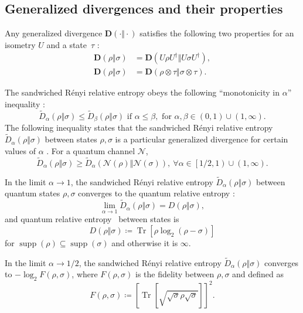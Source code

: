 \documentclass[aps,pra,twocolumn,superscriptaddress,longbibliography]{revtex4-1}
\def\Tr{\operatorname{Tr}}
\def\supp{\operatorname{supp}}
\def\){\right)}
\def\[{\left[}
\newcommand{\mc}[1]{\mathcal{#1}}
\newcommand{\wt}[1]{\widetilde{#1}}
\newcommand{\tf}[1]{\textbf{#1}}
\begin{document}
\begin{appendix}

\section{Generalized divergences and their properties}\label{App:Div}
Any generalized divergence $\tf{D}(\cdot\Vert\cdot)$ satisfies the following two properties for an isometry $U$ and a state~$\tau$ \cite{WWY14}:
\begin{align}
\mathbf{D}(\rho\Vert \sigma) & = \mathbf{D}(U\rho U^\dag\Vert U \sigma U^\dag),\label{eq:gen-div-unitary}\\
\mathbf{D}(\rho\Vert \sigma) & = \mathbf{D}(\rho \otimes \tau \Vert \sigma \otimes \tau).\label{eq:gen-div-prod}
\end{align}

The sandwiched R\'enyi relative entropy obeys the following ``monotonicity in $\alpha$'' inequality \cite{MDSFT13}:
\begin{equation}\label{eq:mono_sre}
\wt{D}_\alpha(\rho\Vert\sigma)\leq \wt{D}_\beta(\rho\Vert\sigma) \text{ if }  \alpha\leq \beta, \text{ for } \alpha,\beta\in(0,1)\cup(1,\infty).
\end{equation}
The following inequality states that the sandwiched R\'enyi relative entropy $\wt{D}_\alpha(\rho\Vert\sigma)$ between states $\rho,\sigma$ is a particular generalized divergence for certain values of $\alpha$ \cite{FL13,Bei13}. For a quantum channel $\mc{N}$,
\begin{equation}
\wt{D}_\alpha(\rho\Vert\sigma)\geq \wt{D}_\alpha(\mc{N}(\rho)\Vert\mc{N}(\sigma)), \ \forall \alpha\in \[1/2,1\)\cup (1,\infty).
\end{equation}


In the limit $\alpha\to 1$, the sandwiched R\'enyi relative entropy $\wt{D}_\alpha(\rho\Vert\sigma)$ between quantum states $\rho,\sigma$ converges to the quantum relative entropy \cite{MDSFT13,WWY14}:
\begin{equation}\label{eq:mono_renyi}
\lim_{\alpha\to 1}\wt{D}_\alpha(\rho\Vert\sigma)=D(\rho\Vert\sigma),
\end{equation}
and quantum relative entropy~\cite{Ume62} between states is
\begin{equation}
D(\rho\Vert\sigma)\coloneqq \Tr[\rho\log_2(\rho-\sigma)]
\end{equation}
for $\supp(\rho)\subseteq \supp(\sigma)$ and otherwise it is $\infty$. 

In the limit $\alpha\to 1/2$, the sandwiched R\'enyi relative entropy $\wt{D}_\alpha(\rho\Vert\sigma)$ converges to $-\log_2 F(\rho,\sigma)$, where $F(\rho,\sigma)$ is the fidelity between $\rho, \sigma$ and defined as
\begin{equation}
F(\rho,\sigma)\coloneqq \left[\Tr\left[\sqrt{\sqrt{\sigma}\rho\sqrt{\sigma}}\right]\right]^2.
\end{equation}


\end{appendix}
\end{document}
